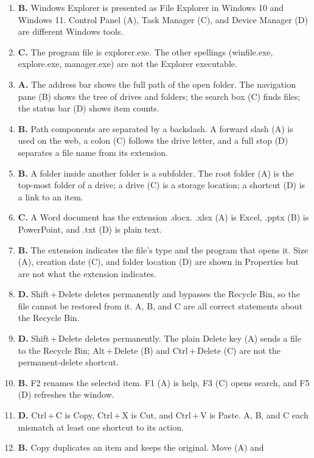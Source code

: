 \begin{enumerate}[label=\textbf{Q\arabic*.}, leftmargin=*]
\item \textbf{B.} Windows Explorer is presented as File Explorer in Windows 10
  and Windows 11. Control Panel (A), Task Manager (C), and Device Manager (D)
  are different Windows tools.
\item \textbf{C.} The program file is explorer.exe. The other spellings
  (winfile.exe, explore.exe, manager.exe) are not the Explorer executable.
\item \textbf{A.} The address bar shows the full path of the open folder. The
  navigation pane (B) shows the tree of drives and folders; the search box (C)
  finds files; the status bar (D) shows item counts.
\item \textbf{B.} Path components are separated by a backslash. A forward
  slash (A) is used on the web, a colon (C) follows the drive letter, and a
  full stop (D) separates a file name from its extension.
\item \textbf{B.} A folder inside another folder is a subfolder. The root
  folder (A) is the top-most folder of a drive; a drive (C) is a storage
  location; a shortcut (D) is a link to an item.
\item \textbf{C.} A Word document has the extension .docx. .xlsx (A) is Excel,
  .pptx (B) is PowerPoint, and .txt (D) is plain text.
\item \textbf{B.} The extension indicates the file's type and the program that
  opens it. Size (A), creation date (C), and folder location (D) are shown in
  Properties but are not what the extension indicates.
\item \textbf{D.} Shift\,+\,Delete deletes permanently and bypasses the
  Recycle Bin, so the file cannot be restored from it. A, B, and C are all
  correct statements about the Recycle Bin.
\item \textbf{D.} Shift\,+\,Delete deletes permanently. The plain Delete key
  (A) sends a file to the Recycle Bin; Alt\,+\,Delete (B) and Ctrl\,+\,Delete
  (C) are not the permanent-delete shortcut.
\item \textbf{B.} F2 renames the selected item. F1 (A) is help, F3 (C) opens
  search, and F5 (D) refreshes the window.
\item \textbf{D.} Ctrl\,+\,C is Copy, Ctrl\,+\,X is Cut, and Ctrl\,+\,V is
  Paste. A, B, and C each mismatch at least one shortcut to its action.
\item \textbf{B.} Copy duplicates an item and keeps the original. Move (A) and

\end{enumerate}
